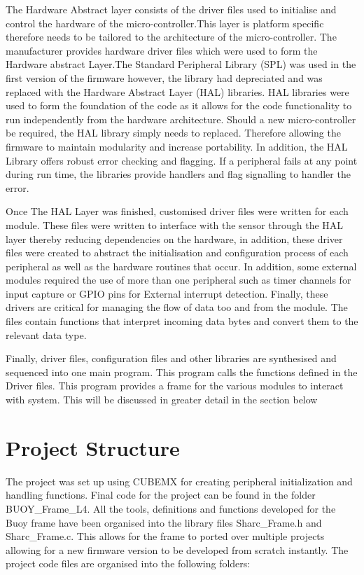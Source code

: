 The Hardware Abstract layer consists of the driver files used to initialise and control the hardware of the micro-controller.This layer is platform specific therefore needs to be tailored to the architecture of the micro-controller. The manufacturer provides hardware driver files which were used to form the Hardware abstract Layer.The Standard Peripheral Library (SPL) was used in the first version of the firmware however, the library had depreciated and was replaced with the Hardware Abstract Layer (HAL) libraries. HAL libraries were used to form the foundation of the code as it allows for the code functionality to run independently from the hardware architecture. Should a new micro-controller be required, the HAL library simply needs to replaced. Therefore allowing the firmware to maintain modularity and increase portability. In addition, the HAL Library offers robust error checking and flagging. If a peripheral fails at any point during run time, the libraries provide handlers and flag signalling to handler the error. \par 
Once The HAL Layer was finished, customised driver files were written for each module. These files were written to interface with the sensor through the HAL layer thereby reducing dependencies on the hardware, in addition, these driver files were created to abstract the initialisation and configuration process of each peripheral as well as the hardware routines that occur. In addition, some external modules required the use of more than one peripheral such as timer channels for input capture or GPIO pins for External interrupt detection. Finally, these drivers are critical for managing the flow of data too and from the module. The files contain functions that interpret incoming data bytes and convert them to the relevant data type.

\par 

Finally, driver files, configuration files and other libraries are synthesised and sequenced into one main program. This program calls the functions defined in the Driver files. This program provides a frame for the various modules to interact with system. This will be discussed in greater detail in the section below

\section{Project Structure}

The project was set up using CUBEMX for creating peripheral initialization and handling functions. Final code for the project can be found in the folder BUOY\_Frame\_L4. All the tools, definitions and functions developed for the Buoy frame have been organised into the library files Sharc\_Frame.h and Sharc\_Frame.c. This allows for the frame to ported over multiple projects allowing for a new firmware version to be developed from scratch instantly.
The project code files are organised into the following folders:

